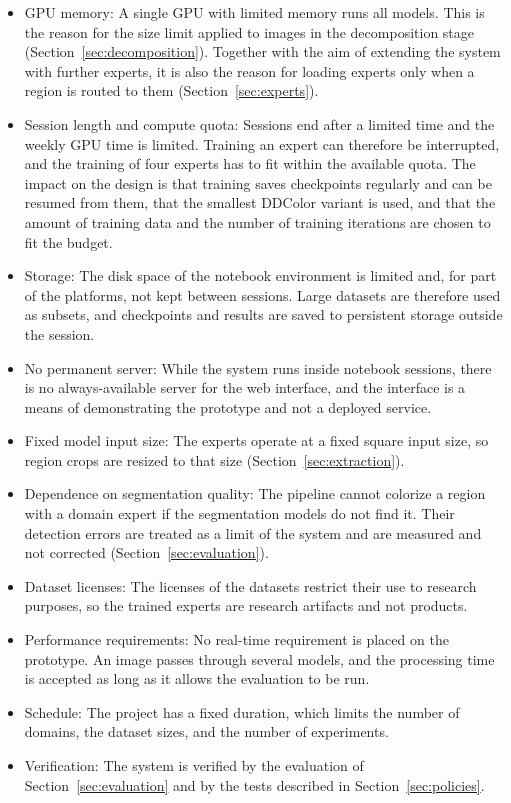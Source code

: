 \documentclass{FastFyp}
\begin{document}
\begin{itemize}
    \item GPU memory: A single GPU with limited memory runs all models. This is the reason for the size limit applied to images in the decomposition stage (Section~\ref{sec:decomposition}). Together with the aim of extending the system with further experts, it is also the reason for loading experts only when a region is routed to them (Section~\ref{sec:experts}).
    \item Session length and compute quota: Sessions end after a limited time and the weekly GPU time is limited. Training an expert can therefore be interrupted, and the training of four experts has to fit within the available quota. The impact on the design is that training saves checkpoints regularly and can be resumed from them, that the smallest DDColor variant is used, and that the amount of training data and the number of training iterations are chosen to fit the budget.
    \item Storage: The disk space of the notebook environment is limited and, for part of the platforms, not kept between sessions. Large datasets are therefore used as subsets, and checkpoints and results are saved to persistent storage outside the session.
    \item No permanent server: While the system runs inside notebook sessions, there is no always-available server for the web interface, and the interface is a means of demonstrating the prototype and not a deployed service.
    \item Fixed model input size: The experts operate at a fixed square input size, so region crops are resized to that size (Section~\ref{sec:extraction}).
    \item Dependence on segmentation quality: The pipeline cannot colorize a region with a domain expert if the segmentation models do not find it. Their detection errors are treated as a limit of the system and are measured and not corrected (Section~\ref{sec:evaluation}).
    \item Dataset licenses: The licenses of the datasets restrict their use to research purposes, so the trained experts are research artifacts and not products.
    \item Performance requirements: No real-time requirement is placed on the prototype. An image passes through several models, and the processing time is accepted as long as it allows the evaluation to be run.
    \item Schedule: The project has a fixed duration, which limits the number of domains, the dataset sizes, and the number of experiments.
    \item Verification: The system is verified by the evaluation of Section~\ref{sec:evaluation} and by the tests described in Section~\ref{sec:policies}.
\end{itemize}
\end{document}
